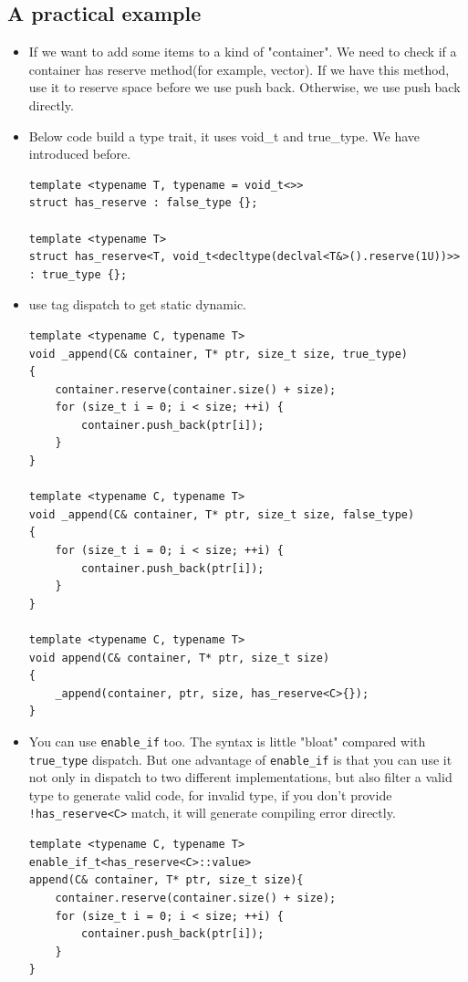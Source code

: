 \documentclass[a4paper,11pt,twoside]{book}
\begin{document}
\subsection{A practical example}
\begin{itemize}
    \item If we want to add some items to a kind of "container". We need to check if a container has reserve method(for example, vector). If we have this method, use it to reserve space before we use push back. Otherwise, we use push back directly.
    \item Below code build a type trait, it uses void\_t and true\_type. We have introduced before. 
\begin{lstlisting}
template <typename T, typename = void_t<>>
struct has_reserve : false_type {};
   
template <typename T>
struct has_reserve<T, void_t<decltype(declval<T&>().reserve(1U))>> : true_type {};   
\end{lstlisting}

    \item use tag dispatch to get static dynamic.
\begin{lstlisting}
template <typename C, typename T>
void _append(C& container, T* ptr, size_t size, true_type)  
{
    container.reserve(container.size() + size);
    for (size_t i = 0; i < size; ++i) {
        container.push_back(ptr[i]);
    }
}

template <typename C, typename T>
void _append(C& container, T* ptr, size_t size, false_type)
{
    for (size_t i = 0; i < size; ++i) {
        container.push_back(ptr[i]);
    }
}

template <typename C, typename T>
void append(C& container, T* ptr, size_t size) 
{ 
    _append(container, ptr, size, has_reserve<C>{}); 
}
\end{lstlisting}

    \item You can use \texttt{enable\_if} too. The syntax is little "bloat" compared with \texttt{true\_type} dispatch. But one advantage of \texttt{enable\_if} is that you can use it not only in dispatch to two different implementations, but also filter a valid type to generate valid code, for invalid type, if you don't provide \texttt{!has\_reserve<C>} match, it will generate compiling error directly.
\begin{lstlisting}
template <typename C, typename T>
enable_if_t<has_reserve<C>::value>
append(C& container, T* ptr, size_t size){
    container.reserve(container.size() + size);
    for (size_t i = 0; i < size; ++i) {
    	container.push_back(ptr[i]);
    }
}


\end{lstlisting}
\end{itemize}
\end{document}
